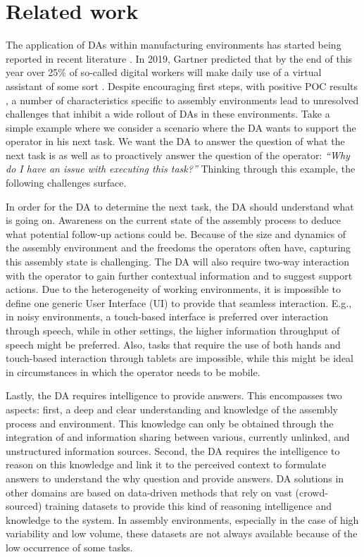 \section{Related work}\label{sec:Literature}
The application of DAs within manufacturing environments has started being reported in recent literature \cite{rabelo2019CollaborativeSoftbotsEnhancing,traub2018FrameworkIllustratingDecisionmaking}. In 2019, Gartner predicted that by the end of this year over 25\% of so-called digital workers will make daily use of a virtual assistant of some sort \cite{gartner2019GartnerPredicts25}. Despite encouraging first steps, with positive POC results \cite{bosch2020SpatialAugmentedReality}, a number of characteristics specific to assembly environments lead to unresolved challenges that inhibit a wide rollout of DAs in these environments. 
Take a simple example where we consider a scenario where the DA wants to support the operator in his next task. We want the DA to answer the question of what the next task is as well as to proactively answer the question of the operator: \textit{``Why do I have an issue with executing this task?''} Thinking through this example, the following challenges surface.

In order for the DA to determine the next task, the DA should understand what is going on. Awareness on the current state of the assembly process to deduce what potential follow-up actions could be. Because of the size and dynamics of the assembly environment and the freedoms the operators often have, capturing this assembly state is challenging. The DA will also require two-way interaction with the operator to gain further contextual information and to suggest support actions. Due to the heterogeneity of working environments, it is impossible to define one generic User Interface (UI) to provide that seamless interaction. E.g., in noisy environments, a touch-based interface is preferred over interaction through speech, while in other settings, the higher information throughput of speech might be preferred. Also, tasks that require the use of both hands and touch-based interaction through tablets are impossible, while this might be ideal in circumstances in which the operator needs to be mobile.

Lastly, the DA requires intelligence to provide answers. This encompasses two aspects: first, a deep and clear understanding and knowledge of the assembly process and environment. This knowledge can only be obtained through the integration of and information sharing between various, currently unlinked, and unstructured information sources. Second, the DA requires the intelligence to reason on this knowledge and link it to the perceived context to formulate answers to understand the why question and provide answers. DA solutions in other domains are based on data-driven methods that rely on vast (crowd-sourced) training datasets to provide this kind of reasoning intelligence and knowledge to the system. In assembly environments, especially in the case of high variability and low volume, these datasets are not always available because of the low occurrence of some tasks.

